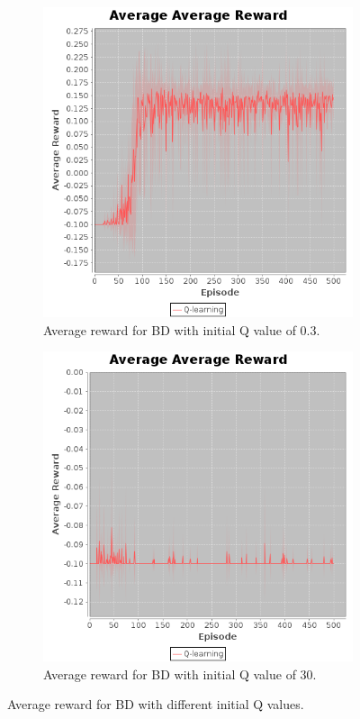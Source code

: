 \documentclass[10pt, twocolumn]{article}
\begin{document}
			\begin{figure}[]
				\centering
				\begin{subfigure}[t]{0.24\textwidth}
					\centering
					\includegraphics[width=\textwidth]{../graphics/BlockDude_0.3_q.png}
					\caption{Average reward for BD with initial Q value of 0.3.}
					\label{fig:BD:qinit1}
				\end{subfigure}
				\begin{subfigure}[t]{0.24\textwidth}
					\centering
					\includegraphics[width=\textwidth]{../graphics/BlockDude_30_q.png}
					\caption{Average reward for BD with initial Q value of 30.}
					\label{fig:BD:qintit2}
				\end{subfigure}
				\caption{Average reward for BD with different initial Q values.}
				\label{fig:BD:aqinit}
			\end{figure}
\end{document}
